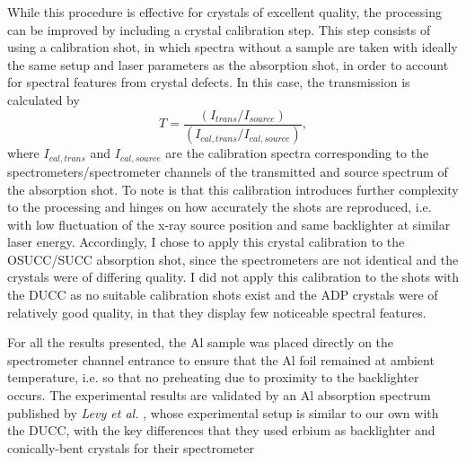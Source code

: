 While this procedure is effective for crystals of excellent quality, the processing can be improved by including a crystal calibration step. This step consists of using a calibration shot, in which spectra without a sample are taken with ideally the same setup and laser parameters as the absorption shot, in order to account for spectral features from crystal defects. In this case, the transmission is calculated by
\begin{equation}
	T = \frac{(I_{trans}/I_{source})}{(I_{cal,trans}/I_{cal,source})},
\end{equation}
where $I_{cal,trans}$ and $I_{cal,source}$ are the calibration spectra corresponding to the spectrometers/spectrometer channels of the transmitted and source spectrum of the absorption shot. To note is that this calibration introduces further complexity to the processing and hinges on how accurately the shots are reproduced, i.e. with low fluctuation of the x-ray source position and same backlighter at similar laser energy. Accordingly, I chose to apply this crystal calibration to the OSUCC/SUCC absorption shot, since the spectrometers are not identical and the crystals were of differing quality. I did not apply this calibration to the shots with the DUCC as no suitable calibration shots exist and the ADP crystals were of relatively good quality, in that they display few noticeable spectral features.

For all the results presented, the Al sample was placed directly on the spectrometer channel entrance to ensure that the Al foil remained at ambient temperature, i.e. so that no preheating due to proximity to the backlighter occurs. The experimental results are validated by an Al absorption spectrum published by \textit{Levy et al.} \citep{levy2010double}, whose experimental setup is similar to our own with the DUCC, with the key differences that they used erbium as backlighter and conically-bent crystals for their spectrometer



